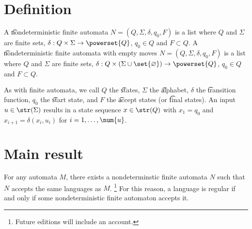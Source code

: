 
\section*{Definition}

A \t{nondeterministic finite automata} $N = (Q, \Sigma , \delta , q_0, F)$ is a list where $Q$ and $\Sigma $ are finite sets, $\delta : Q \times  \Sigma  \to \powerset{Q}$, $q_0 \in Q$ and $F \subset Q$.
A \t{nondeterministic finite automata with empty moves} $N = (Q, \Sigma , \delta , q_0, F)$ is a list where $Q$ and $\Sigma $ are finite sets, $\delta : Q \times  (\Sigma  \cup \set{\varnothing}) \to \powerset{Q}$, $q_0 \in Q$ and $F \subset Q$.

As with finite automata, we call $Q$ the \t{states}, $\Sigma $ the \t{alphabet}, $\delta $ the \t{transition function}, $q_0$ the \t{start state}, and $F$ the \t{accept states} (or \t{final states}).
An input $u \in \str(\Sigma )$ results in a state sequence $x \in \str(Q)$ with $x_1 = q_0$ and $x_{i+1} = \delta (x_i, u_i)$ for $i = 1, \dots , \num{u}$.

\section*{Main result}

For any automata $M$, there exists a nondeterminstic finite automata $N$ such that $N$ accepts the same languages as $M$.
  \ifhmode\unskip\fi\footnote{
Future editions will include an account.
  }
For this reason, a language is regular if and only if some nondeterministic finite automaton accepts it.

\blankpage